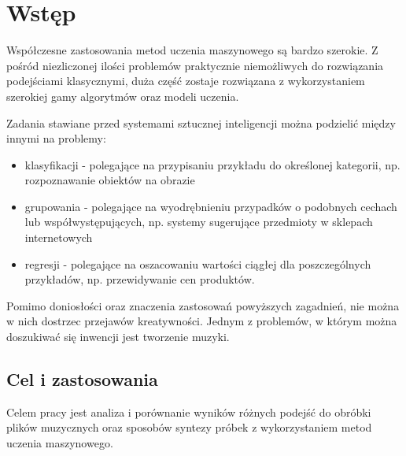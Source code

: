 
\chapter{Wstęp}
{




    Współczesne zastosowania metod uczenia maszynowego są bardzo szerokie.
    Z pośród niezliczonej ilości problemów praktycznie niemożliwych do rozwiązania podejściami klasycznymi, 
    duża część zostaje rozwiązana z wykorzystaniem szerokiej gamy algorytmów oraz modeli uczenia.
        
    Zadania stawiane przed systemami sztucznej inteligencji można podzielić między innymi na problemy:
    \begin{itemize}
        \item klasyfikacji - polegające na przypisaniu przykładu do określonej kategorii, 
        np. rozpoznawanie obiektów na obrazie 
        \item grupowania - polegające na wyodrębnieniu przypadków o podobnych cechach 
        lub współwystępujących, np. systemy sugerujące przedmioty w sklepach internetowych
        \item regresji - polegające na oszacowaniu wartości ciągłej dla poszczególnych przykładów, 
        np. przewidywanie cen produktów.
    \end{itemize}
    Pomimo doniosłości oraz znaczenia zastosowań powyższych zagadnień,
    nie można w nich dostrzec przejawów kreatywności.
    Jednym z problemów, w którym można doszukiwać się inwencji jest tworzenie muzyki.

    \section{Cel i zastosowania}
    {
        Celem pracy jest analiza i porównanie wyników różnych podejść 
        do obróbki plików muzycznych oraz sposobów syntezy próbek 
        z wykorzystaniem metod uczenia maszynowego. 

}}
